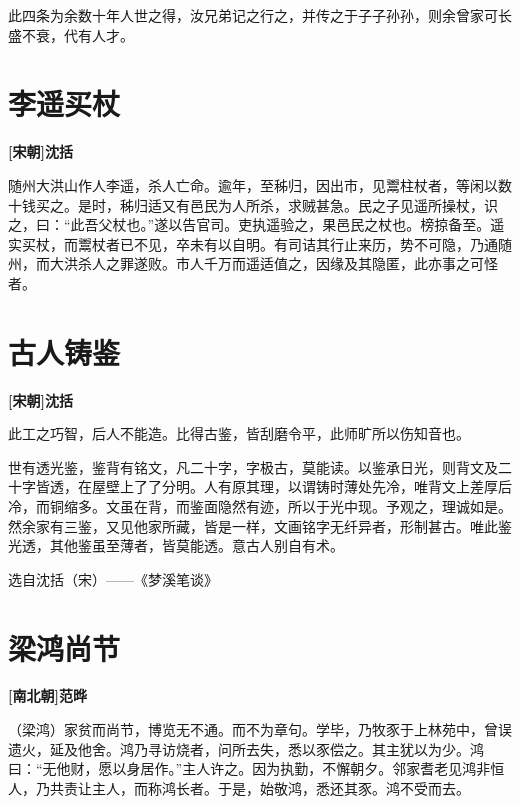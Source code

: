 \documentclass[UTF8,titlepage,oneside]{ctexbook}
\begin{document}
此四条为余数十年人世之得，汝兄弟记之行之，并传之于子子孙孙，则余曾家可长盛不衰，代有人才。



\chapter*{李遥买杖}
\begin{center}
	\textbf{[宋朝]沈括}
\end{center}


随州大洪山作人李遥，杀人亡命。逾年，至秭归，因出市，见鬻柱杖者，等闲以数十钱买之。是时，秭归适又有邑民为人所杀，求贼甚急。民之子见遥所操杖，识之，曰：“此吾父杖也。”遂以告官司。吏执遥验之，果邑民之杖也。榜掠备至。遥实买杖，而鬻杖者已不见，卒未有以自明。有司诘其行止来历，势不可隐，乃通随州，而大洪杀人之罪遂败。市人千万而遥适值之，因缘及其隐匿，此亦事之可怪者。

\chapter*{古人铸鉴}
\begin{center}
	\textbf{[宋朝]沈括}
\end{center}


此工之巧智，后人不能造。比得古鉴，皆刮磨令平，此师旷所以伤知音也。

世有透光鉴，鉴背有铭文，凡二十字，字极古，莫能读。以鉴承日光，则背文及二十字皆透，在屋壁上了了分明。人有原其理，以谓铸时薄处先冷，唯背文上差厚后冷，而铜缩多。文虽在背，而鉴面隐然有迹，所以于光中现。予观之，理诚如是。然余家有三鉴，又见他家所藏，皆是一样，文画铭字无纤异者，形制甚古。唯此鉴光透，其他鉴虽至薄者，皆莫能透。意古人别自有术。


选自沈括（宋）——《梦溪笔谈》



\chapter*{梁鸿尚节}
\begin{center}
	\textbf{[南北朝]范晔}
\end{center}


（梁鸿）家贫而尚节，博览无不通。而不为章句。学毕，乃牧豕于上林苑中，曾误遗火，延及他舍。鸿乃寻访烧者，问所去失，悉以豕偿之。其主犹以为少。鸿曰：“无他财，愿以身居作。”主人许之。因为执勤，不懈朝夕。邻家耆老见鸿非恒人，乃共责让主人，而称鸿长者。于是，始敬鸿，悉还其豕。鸿不受而去。
\end{document}
